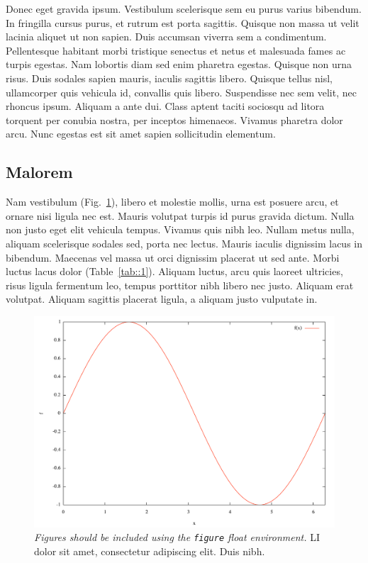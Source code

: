 \documentclass[final,los,index,glossary,loa]{ryethesis}
\begin{document}
Donec eget gravida ipsum. Vestibulum scelerisque sem eu purus varius bibendum. In fringilla cursus purus, et rutrum est porta sagittis. Quisque non massa ut velit lacinia aliquet ut non sapien. Duis accumsan viverra sem a condimentum. Pellentesque habitant morbi tristique senectus et netus et malesuada fames ac turpis egestas. Nam lobortis diam sed enim pharetra egestas. Quisque non urna risus. Duis sodales sapien mauris, iaculis sagittis libero. Quisque tellus nisl, ullamcorper quis vehicula id, convallis quis libero. Suspendisse nec sem velit, nec rhoncus ipsum. Aliquam a ante dui. Class aptent taciti sociosqu ad litora torquent per conubia nostra, per inceptos himenaeos. Vivamus pharetra dolor arcu. Nunc egestas est sit amet sapien sollicitudin elementum.

\subsection{Malorem}
Nam vestibulum (Fig.~\ref{fig::1}), libero et molestie mollis, urna est posuere arcu, et ornare nisi ligula nec est. Mauris volutpat turpis id purus gravida dictum. Nulla non justo eget elit vehicula tempus. Vivamus quis nibh leo. Nullam metus nulla, aliquam scelerisque sodales sed, porta nec lectus. Mauris iaculis dignissim lacus in bibendum. Maecenas vel massa ut orci dignissim placerat ut sed ante. Morbi luctus lacus dolor (Table~\ref{tab::1}). Aliquam luctus, arcu quis laoreet ultricies, risus ligula fermentum leo, tempus porttitor nibh libero nec justo. Aliquam erat volutpat. Aliquam sagittis placerat ligula, a aliquam justo vulputate in.
\begin{figure}
\begin{center}
\includegraphics[width=\textwidth,keepaspectratio=true]{figure1.pdf}
\caption[Lorem ipsum dolor sit amet, consectetur adipiscing elit.]{\textit{Figures should be included using the \texttt{figure} float environment.} \Gls{LI} dolor sit amet, consectetur adipiscing elit. Duis nibh.}\label{fig::1}
\end{center}
\end{figure}
\end{document}
